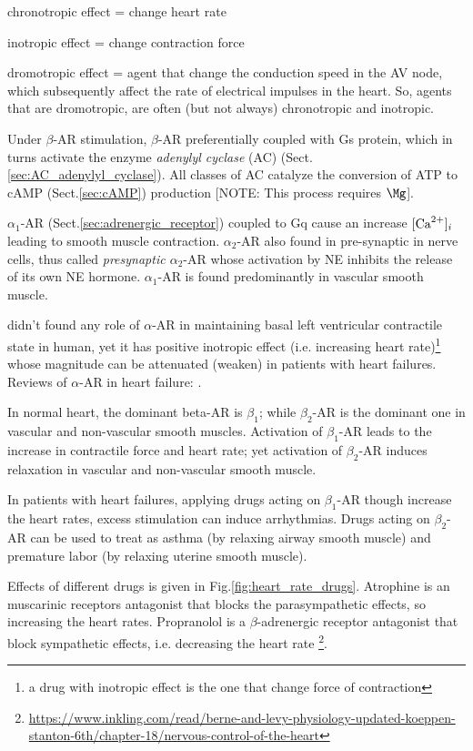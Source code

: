 \begin{framed}
chronotropic effect = change heart rate

inotropic effect = change contraction force

dromotropic effect = agent that change the conduction speed in the AV node,
which subsequently affect the rate of electrical impulses in the heart. So,
agents that are dromotropic, are often (but not always) chronotropic and
inotropic.
\end{framed}

Under $\beta$-AR stimulation, $\beta$-AR preferentially coupled with Gs protein,
which in turns activate the enzyme {\it adenylyl cyclase} (AC)
(Sect.\ref{sec:AC_adenylyl_cyclase}). All classes of AC catalyze the conversion
of ATP to cAMP (Sect.\ref{sec:cAMP}) production [NOTE: This process requires
$\Mg$].

$\alpha_1$-AR (Sect.\ref{sec:adrenergic_receptor}) coupled to Gq cause an
increase $[{\text{Ca}^{2+}}]_i$ leading to smooth muscle contraction.
$\alpha_2$-AR also found in pre-synaptic in nerve cells, thus called {\it
presynaptic $\alpha_2$}-AR whose activation by NE inhibits the release of its
own NE hormone. $\alpha_1$-AR is found predominantly in vascular smooth muscle.

\citep{Landzberg1991} didn't found any role of $\alpha$-AR in maintaining basal
left ventricular contractile state in human, yet it has positive inotropic
effect (i.e. increasing heart rate)\footnote{a drug with inotropic effect is the
one that change force of contraction} whose magnitude can be attenuated (weaken)
in patients with heart failures. Reviews of $\alpha$-AR in heart failure:
\citep{shannon2006}.

In normal heart, the dominant beta-AR is $\beta_1$; while $\beta_2$-AR is the
dominant one in vascular and non-vascular smooth muscles. Activation of
$\beta_1$-AR leads to the increase in contractile force and heart rate; yet
activation of $\beta_2$-AR induces relaxation in vascular and non-vascular
smooth muscle. 

In patients with heart failures, applying drugs acting on $\beta_1$-AR though
increase the heart rates, excess stimulation can induce arrhythmias. Drugs
acting on $\beta_2$-AR can be used to treat as asthma (by relaxing airway smooth
muscle) and premature labor (by relaxing uterine smooth muscle).




Effects of different drugs is given in Fig.\ref{fig:heart_rate_drugs}. Atrophine
is an muscarinic receptors antagonist that blocks the parasympathetic effects,
so increasing the heart rates. Propranolol is a $\beta$-adrenergic receptor
antagonist that block sympathetic effects, i.e. decreasing the heart rate
\footnote{\url{https://www.inkling.com/read/berne-and-levy-physiology-updated-koeppen-stanton-6th/chapter-18/nervous-control-of-the-heart}}.

